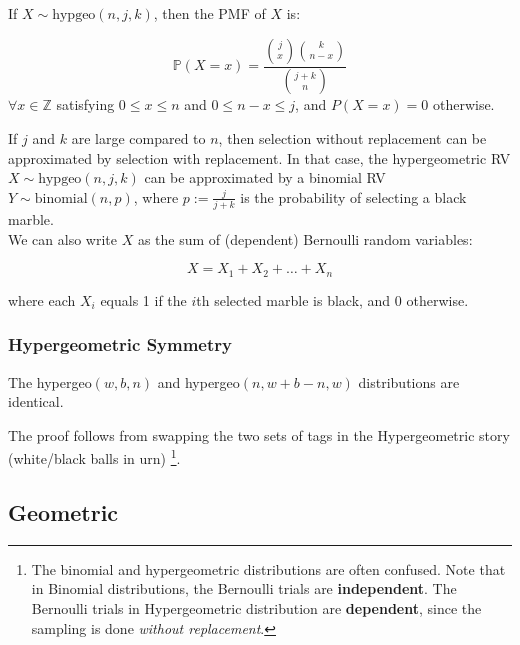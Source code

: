 \documentclass{article}
\begin{document}
\begin{theorem}
    If $X \sim \text{hypgeo}(n, j, k)$, then the PMF of $X$ is:

    \begin{equation*}
        \mathbb{P}(X = x) = \frac{\binom{j}{x}\binom{k}{n-x}}{\binom{j+k}{n}}
    \end{equation*}
    \noindent $\forall x \in \mathbb{Z}$ satisfying $0\leq x \leq n$ and $0\leq n-x \leq j$, and $P(X=x) = 0$ otherwise. 
\end{theorem}

\noindent If $j$ and $k$ are large compared to $n$, then selection without replacement can be approximated by selection with replacement. In that case, the hypergeometric RV $X \sim \text{hypgeo}(n,j,k)$ can be approximated by a binomial RV $Y \sim \text{binomial}(n,p)$, where $p := \frac{j}{j+k}$ is the probability of selecting a black marble. \\

\noindent We can also write $X$ as the sum of (dependent) Bernoulli random variables:

\begin{equation*}
    X = X_{1} + X_{2} + \dots + X_n
\end{equation*}

where each $X_i$ equals 1 if the $i$th selected marble is black, and 0 otherwise. 


\subsubsection{Hypergeometric Symmetry}

\begin{theorem}
    The hypergeo$(w,b,n)$ and hypergeo$(n,w+b-n,w)$ distributions are identical. 
\end{theorem}

\noindent The proof follows from swapping the two sets of tags in the Hypergeometric story (white/black balls in urn) \footnote[3]{The binomial and hypergeometric distributions are often confused. Note that in Binomial distributions, the Bernoulli trials are \textbf{independent}. The Bernoulli trials in Hypergeometric distribution are \textbf{dependent}, since the sampling is done \textit{without replacement}.}. 


\subsection{Geometric}
\end{document}
